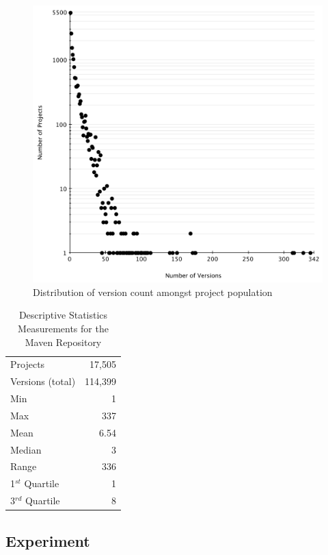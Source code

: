 \documentclass[conference]{IEEEtran}
\begin{document}
\begin{figure}
	\centering
	\includegraphics[scale=0.6]{version_count.pdf}
	\caption{Distribution of version count amongst project population}
	\label{fig:version-count}
\end{figure}

\begin{table}
\centering
\caption{Descriptive Statistics Measurements for the Maven Repository}
\label{tbl:repository}
\begin{tabular}{l r}
 \hline
Projects & 17,505\\
Versions (total) & 114,399\\
Min & 1\\
Max & 337\\
Mean & 6.54\\
Median & 3\\
Range & 336\\
1$^{st}$ Quartile & 1\\
3$^{rd}$ Quartile & 8\\
\hline
\end{tabular}
\end{table}

\subsection{Experiment}
\label{sec:exp}
\end{document}
